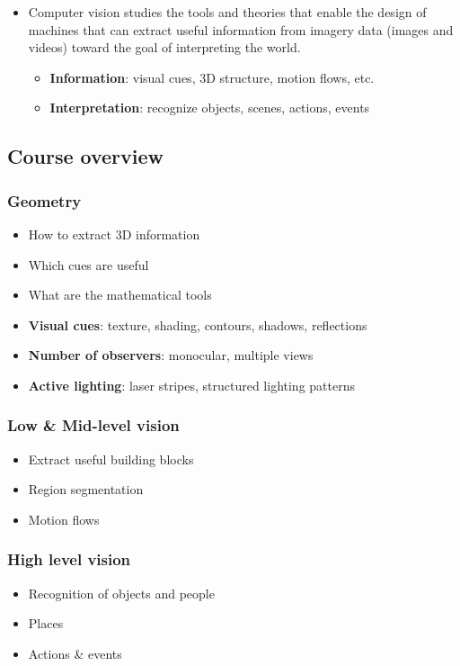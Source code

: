 \begin{itemize}
	\item Computer vision studies the tools and theories that enable the design of machines that can extract useful information from imagery data (images and videos) toward the goal of interpreting the world.
	\begin{itemize}
		\item \textbf{Information}: visual cues, 3D structure, motion flows, etc.
		\item \textbf{Interpretation}: recognize objects, scenes, actions, events
	\end{itemize}
\end{itemize}

\subsection{Course overview}
\subsubsection{Geometry}
\begin{itemize}
	\item How to extract 3D information
	\item Which cues are useful
	\item What are the mathematical tools
	\item \textbf{Visual cues}: texture, shading, contours, shadows, reflections
	\item \textbf{Number of observers}: monocular, multiple views
	\item \textbf{Active lighting}: laser stripes, structured lighting patterns
\end{itemize}

\subsubsection{Low \& Mid-level vision}
\begin{itemize}
	\item Extract useful building blocks
	\item Region segmentation
	\item Motion flows
\end{itemize}

\subsubsection{High level vision}
\begin{itemize}
	\item Recognition of objects and people
	\item Places
	\item Actions \& events
\end{itemize}